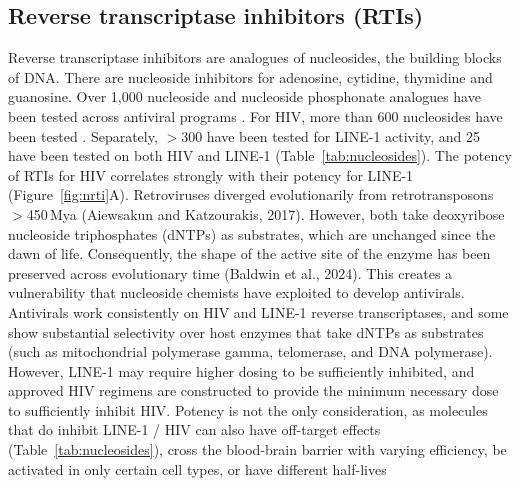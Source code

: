 \documentclass[11pt,twocolumn,twoside]{extarticle}
\begin{document}
\subsection{Reverse transcriptase inhibitors (RTIs)}
Reverse transcriptase inhibitors are analogues of nucleosides, the building blocks of DNA. There are nucleoside inhibitors for adenosine, cytidine, thymidine and guanosine. Over 1,000 nucleoside and nucleoside phosphonate analogues have been tested across antiviral programs \cite{siegel}. For HIV, more than 600 nucleosides have been tested \cite{raheemcroi}. Separately, $>$300 have been tested for LINE-1 activity, and 25 have been tested on both HIV and LINE-1 (Table~\ref{tab:nucleosides}). The potency of RTIs for HIV correlates strongly with their potency for LINE-1 (Figure~\ref{fig:nrti}A). Retroviruses diverged evolutionarily from retrotransposons $>$450\,Mya (Aiewsakun and Katzourakis, 2017). However, both take deoxyribose nucleoside triphosphates (dNTPs) as substrates, which are unchanged since the dawn of life. Consequently, the shape of the active site of the enzyme has been preserved across evolutionary time (Baldwin et al., 2024). This creates a vulnerability that nucleoside chemists have exploited to develop antivirals. Antivirals work consistently on HIV and LINE-1 reverse transcriptases, and some show substantial selectivity over host enzymes that take dNTPs as substrates (such as mitochondrial polymerase gamma, telomerase, and DNA polymerase). However, LINE-1 may require higher dosing to be sufficiently inhibited, and approved HIV regimens are constructed to provide the minimum necessary dose to sufficiently inhibit HIV. Potency is not the only consideration, as molecules that do inhibit LINE-1 / HIV can also have off-target effects (Table~\ref{tab:nucleosides}), cross the blood-brain barrier with varying efficiency, be activated in only certain cell types, or have different half-lives
\end{document}
